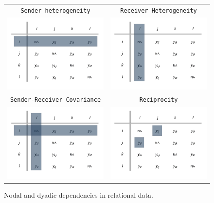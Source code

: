 \begin{figure}
	\begin{tabular}{cc}
		\texttt{Sender heterogeneity} & \texttt{Receiver Heterogeneity} \\
		\includegraphics[width=.45\textwidth]{adjRowDep.png} & \includegraphics[width=.45\textwidth]{adjColDep.png} \\
		\texttt{Sender-Receiver Covariance} & \texttt{Reciprocity} \\
		\includegraphics[width=.45\textwidth]{adjRowColCovar.png} & \includegraphics[width=.45\textwidth]{adjRecip.png} \\
	\end{tabular}
	\caption{Nodal and dyadic dependencies in relational data.}
	\label{fig:adjMatDeps}
\end{figure}

